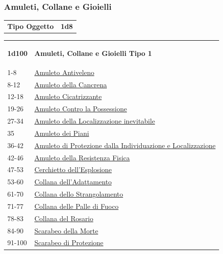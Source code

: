 \begin{multicols}{2}
{\subsubsection{Amuleti, Collane e Gioielli}\hypertarget{amuleticollanegioielli}{}\label{amuleticollanegioielli}

{\small\begin{tabular}{ll}
\textbf{Tipo Oggetto}&\textbf{1d8}\\
\end{tabular}}

\medskip

{\small\begin{tabularx}{0.45\textwidth}{lX}\hypertarget{amuleticollanegioielli1}{}
\textbf{1d100} & \textbf{Amuleti, Collane e Gioielli Tipo 1}\\
1-8 & \hyperlink{AmuletoAntiveleno}{Amuleto Antiveleno}\\
8-12& \hyperlink{AmuletodellaCancrena}{Amuleto della Cancrena}\\
12-18 & \hyperlink{AmuletoCicatrizzante}{Amuleto Cicatrizzante}\\
19-26 & \hyperlink{AmuletoControlaPossessione}{Amuleto Contro la Possessione}\\
27-34 & \hyperlink{AmuletodellaLocalizzazioneinevitabile}{Amuleto della Localizzazione inevitabile}\\
35& \hyperlink{Amuleto dei Piani}{Amuleto dei Piani}\\
36-42 & \hyperlink{AmuletodiProtezionedallaIndividuazioneeLocalizzazione}{Amuleto di Protezione dalla Individuazione e Localizzazione}\\
42-46 & \hyperlink{AmuletodellaResistenzaFisica}{Amuleto della Resistenza Fisica}\\
47-53 & \hyperlink{Cerchiettodell'Esplosione}{Cerchietto dell'Esplosione}\\
53-60 & \hyperlink{Collanadell'Adattamento}{Collana dell'Adattamento}\\
61-70 & \hyperlink{CollanadelloStrangolamento}{Collana dello Strangolamento}\\
71-77 & \hyperlink{CollanadellePallediFuoco}{Collana delle Palle di Fuoco}\\
78-83 & \hyperlink{CollanadelRosario}{Collana del Rosario}\\
84-90 & \hyperlink{ScarabeodellaMorte}{Scarabeo della Morte}\\
91-100& \hyperlink{ScarabeodiProtezione}{Scarabeo di Protezione}
\end{tabularx}}

}
\end{multicols}
